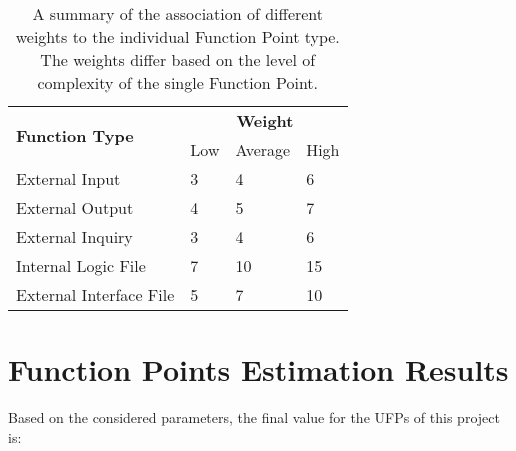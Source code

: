 \begin{table}[H]
    \centering
    \begin{tabular}{ l | l | l | l }
        \hline
        \multirow{2}{*}{\textbf{Function Type}} & \multicolumn{3}{c}{\textbf{Weight}} \\
        \cline{2-4}
        & Low & Average & High \\
        \hline
        \hline
        External Input          & 3     & 4     & 6     \\
        \hline
        External Output         & 4     & 5     & 7     \\
        \hline
        External Inquiry        & 3     & 4     & 6     \\
        \hline
        Internal Logic File     & 7     & 10    & 15    \\
        \hline
        External Interface File & 5     & 7     & 10    \\
        \hline
    \end{tabular}
    \caption{A summary of the association of different weights to the individual Function Point type. The weights differ based on the level of complexity of the single Function Point.}
    \label{fps_weights}
\end{table}


\section{Function Points Estimation Results}
Based on the considered parameters, the final value for the UFPs of this project is: %


